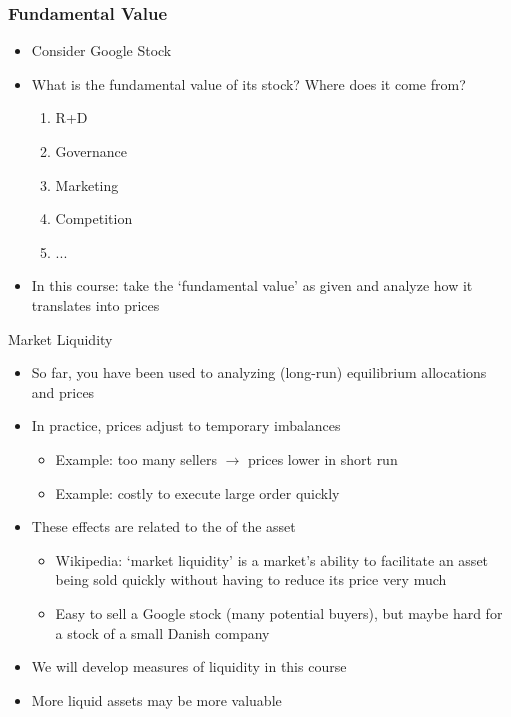 \documentclass[english,10pt]{beamer}
\theoremstyle{definition}
\begin{document}
\begin{frame}[label=main4]
\frametitle{Fundamental Value}
\begin{itemize}
	\item Consider Google Stock
	\item What is the fundamental value of its stock? Where does it come from?
	\begin{enumerate}
		\item R+D
		\item Governance
		\item Marketing
		\item Competition
		\item ...
	\end{enumerate}
	\item In this course: take the `fundamental value' as given and analyze how it translates into prices
	
	\hyperlink{quote}{}
\end{itemize}
\end{frame}


\begin{frame}{Market Liquidity}
\begin{itemize}
	\item So far, you have been used to analyzing (long-run) equilibrium allocations and prices
	\item In practice, prices adjust to temporary imbalances
	\begin{itemize}
		\item Example: too many sellers $\rightarrow$ prices lower in short run
		\item Example: costly to execute large order quickly
	\end{itemize}
	\item These effects are related to the  of the asset
	\begin{itemize}
		\item Wikipedia: `market liquidity' is a market's ability to facilitate an asset being sold quickly without having to reduce its price very much
		\item Easy to sell a Google stock (many potential buyers), but maybe hard for a stock of a small Danish company
	\end{itemize}
	\item We will develop measures of liquidity in this course
	\item More liquid assets may be more valuable
\end{itemize}
\end{frame}
\end{document}
